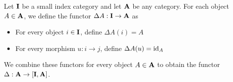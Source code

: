 \begin{definition}\label{def:diagonal_functor}\cite[143]{Leinster2014}
  Let $\operatorname{\mathbf{I}}$ be a small index category and let $\operatorname{\mathbf{A}}$ be any category. For each object $A \in \operatorname{\mathbf{A}}$, we define the functor $\Delta A: \operatorname{\mathbf{I}} \to \operatorname{\mathbf{A}}$ as
  \begin{itemize}
    \item For every object $i \in \operatorname{\mathbf{I}}$, define $\Delta A(i) = A$
    \item For every morphism $u: i \to j$, define $\Delta A(u) = \operatorname{id}_A$
  \end{itemize}

  We combine these functors for every object $A \in \operatorname{\mathbf{A}}$ to obtain the functor $\Delta: \operatorname{\mathbf{A}} \to [\operatorname{\mathbf{I}}, \operatorname{\mathbf{A}}]$.
\end{definition}

